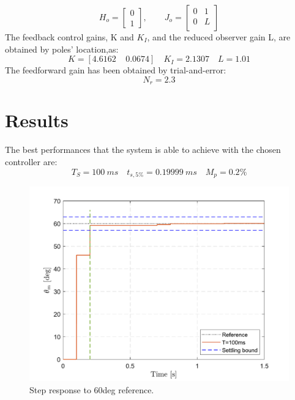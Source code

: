 \documentclass[11pt]{article}
\begin{document}
\begin{equation}
H_o
= 
	\left[
	\begin{array}{ccc}
	0 \\
	1
	\end{array}
	\right],
\qquad 
J_o
= 
	\left[
	\begin{array}{cc}
	0 & 1\\
	0 & L\\
	\end{array}
	\right]
\end{equation}
The feedback control gains, K and $K_I$, and the reduced observer gain L, are obtained by poles' location,as:
	\begin{equation}
		K = [4.6162 \:\:\:\:\:  0.0674] \quad K_I = 2.1307		\quad L = 1.01
	\end{equation} 
The feedforward gain has been obtained by trial-and-error:
	\begin{equation}
		N_r = 2.3
	\end{equation} 


\section{Results}
The best performances that the system is able to achieve with the chosen controller are:
	\begin{equation}
		 T_S = 100\:ms		\quad	t_{s,5\%} = 0.19999\:ms	\quad M_p =0.2\%
	\end{equation} 

	\begin{figure}[h!]
		\centering\includegraphics[scale=0.6]{images/Step_60}
		\caption{Step response to 60deg reference.}
	\end{figure}
			
\end{document}

